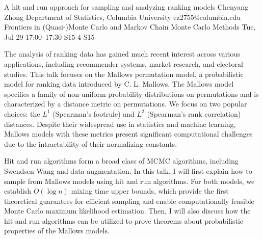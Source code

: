 \begin{talk}
  {A hit and run approach for sampling and analyzing ranking models}%
  {Chenyang Zhong}%
  {Department of Statistics, Columbia University}%
  {cz2755@columbia.edu}%
  {Frontiers in (Quasi-)Monte Carlo and Markov Chain Monte Carlo Methods}%
  {}%
  {Tue, Jul 29 17:00–17:30}%
  {S15-4}%
  {S15}%
				
			
The analysis of ranking data has gained much recent interest across various applications, including recommender systems, market research, and electoral studies. This talk focuses on the Mallows permutation model, a probabilistic model for ranking data introduced by C. L. Mallows. The Mallows model specifies a family of non-uniform probability distributions on permutations and is characterized by a distance metric on permutations. We focus on two popular choices: the $L^1$ (Spearman’s footrule) and $L^2$ (Spearman’s rank correlation) distances. Despite their widespread use in statistics and machine learning, Mallows models with these metrics present significant computational challenges due to the intractability of their normalizing constants.

Hit and run algorithms form a broad class of MCMC algorithms, including Swendsen-Wang and data augmentation. In this talk, I will first explain how to sample from Mallows models using hit and run algorithms. For both models, we establish $O(\log n)$ mixing time upper bounds, which provide the first theoretical guarantees for efficient sampling and enable computationally feasible Monte Carlo maximum likelihood estimation. Then, I will also discuss how the hit and run algorithms can be utilized to prove theorems about probabilistic properties of the Mallows models.

\medskip


\end{talk}

